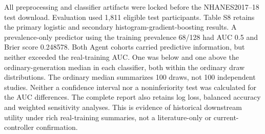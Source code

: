 \documentclass[11pt,letterpaper]{article}
\begin{document}
All preprocessing and classifier artifacts were locked before the NHANES2017–\allowbreak{}18 test download. Evaluation used 1,811 eligible test participants. Table S8 retains the primary logistic and secondary histogram-gradient-boosting results. A prevalence-only predictor using the training prevalence 68/\allowbreak{}128 had AUC 0.5 and Brier score 0.248578. Both Agent cohorts carried predictive information, but neither exceeded the real-training AUC. One was below and one above the ordinary-generation median in each classifier, both within the ordinary draw distributions. The ordinary median summarizes 100 draws, not 100 independent studies. Neither a confidence interval nor a noninferiority test was calculated for the AUC differences. The complete report also retains log loss, balanced accuracy and weighted sensitivity analyses. This is evidence of historical downstream utility under rich real-training summaries, not a literature-only or current-controller confirmation.


\FloatBarrier

\begingroup

\small

\renewcommand{\arraystretch}{1.22}
\end{document}

